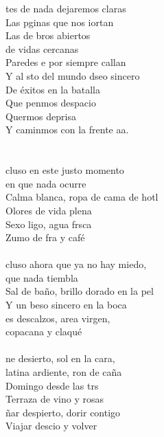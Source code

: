 \begin{cancion}[Copacabana][Izal]%
	tes de nada dejaremos claras\\
	Las pginas que nos iortan\\
	Las de bros abiertos \\
de vidas cercanas\\
	Paredes e por siempre callan\\
	Y al sto del mundo dseo sincero\\
De éxitos en la batalla\\
	Que penmos despacio\\
	Quermos deprisa\\
	Y caminmos con la frente aa.\\
	\jump\\
\jump\\
	cluso en este justo momento \\
en que nada ocurre\\
	Calma blanca, ropa de cama de hotl\\
Olores de vida plena\\
	Sexo ligo, agua frsca\\
	Zumo de fra y café\\
\jump\\
	cluso ahora que ya no hay miedo, \\
que nada tiembla\\
	Sal de baño, brillo dorado en la pel\\
Y un beso sincero en la boca\\
	es descalzos, area virgen, \\
	copacana y claqué\\
\jump\\
	ne desierto, sol en la cara, \\
latina ardiente, ron de caña\\
	Domingo desde las trs\\
Terraza de vino y rosas\\
	ñar despierto, dorir contigo\\
	Viajar descio y volver\\\jump\\

\end{cancion}
